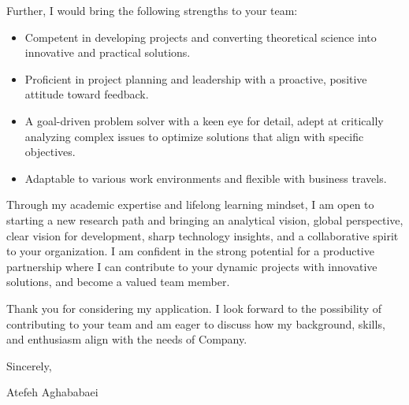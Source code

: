 \documentclass[11pt,a4paper,sans]{moderncv} %
\newcommand{\compname}{Company} %
\begin{document}
Further, I would bring the following strengths to your team:
\renewcommand{\labelitemi}{--}
\begin{itemize}
    \item Competent in developing projects and converting theoretical science into innovative and practical solutions.
    \item Proficient in project planning and leadership with a proactive, positive attitude toward feedback.
    \item A goal-driven problem solver with a keen eye for detail, adept at critically analyzing complex issues to optimize solutions that align with specific objectives.
    \item Adaptable to various work environments and flexible with business travels.
\end{itemize}
Through my academic expertise and lifelong learning mindset, I am open to starting a new research path and bringing an analytical vision, global perspective, clear vision for development, sharp technology insights, and a collaborative spirit to your organization. I am confident in the strong potential for a productive partnership where I can contribute to your dynamic projects with innovative solutions, and become a valued team member.

Thank you for considering my application. I look forward to the possibility of contributing to your team and am eager to discuss how my background, skills, and enthusiasm align with the needs of \compname.

\vspace{0.5cm}

Sincerely,%

Atefeh Aghababaei
\end{document}
